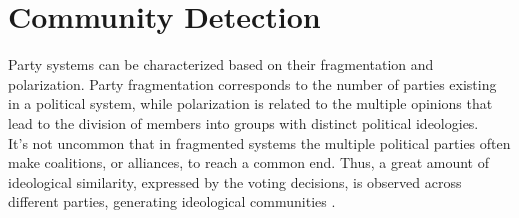 \section{Community Detection}
Party systems can be characterized based on their fragmentation and polarization. Party fragmentation corresponds to the number of parties existing in a political system, while polarization is related to the multiple opinions that lead to the division of members into groups with distinct political ideologies.\\
It's not uncommon that in fragmented systems the multiple political parties often make coalitions, or alliances, to reach a common end. Thus, a great amount of ideological similarity, expressed by the voting decisions, is observed across different parties, generating ideological communities \cite{AnIdeoComm}.\\

